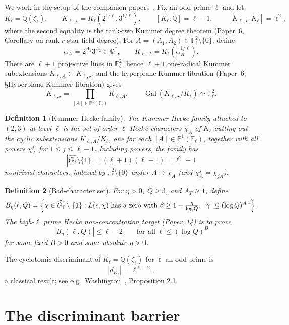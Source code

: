 \documentclass[11pt]{article}
\newtheorem{definition}{Definition}
\newcommand{\Q}{\mathbb Q}
\newcommand{\F}{\mathbb F}
\newcommand{\Pj}{\mathbb P}
\newcommand{\1}{\mathbf 1}
\newcommand{\Gal}{\operatorname{Gal}}
\begin{document}
We work in the setup of the companion papers~\cite{paper2,paper6,paper14}.  Fix an odd prime \(\ell\) and let
\[
K_\ell=\Q(\zeta_\ell),
\qquad
K_{\ell,\star}=K_\ell(2^{1/\ell},3^{1/\ell}),
\qquad
[K_\ell:\Q]=\ell-1,
\qquad
[K_{\ell,\star}:K_\ell]=\ell^2,
\]
where the second equality is the rank-two Kummer degree theorem (Paper~6, Corollary on rank-\(r\) star field degree).  For \(A=(A_1,A_2)\in\F_\ell^2\setminus\{0\}\), define
\[
\alpha_A=2^{A_1}3^{A_2}\in\Q^*,
\qquad
K_{\ell,A}=K_\ell(\alpha_A^{1/\ell}).
\]
There are \(\ell+1\) projective lines in \(\F_\ell^2\), hence \(\ell+1\) one-radical Kummer subextensions \(K_{\ell,A}\subset K_{\ell,\star}\), and the hyperplane Kummer fibration (Paper~6, \S Hyperplane Kummer fibration) gives
\[
K_{\ell,\star}=\prod_{[A]\in\Pj^1(\F_\ell)}K_{\ell,A},
\qquad
\Gal(K_{\ell,\star}/K_\ell)\simeq\F_\ell^2.
\]

\begin{definition}[Kummer Hecke family]\label{D:kummer-family}
The Kummer Hecke family attached to \((2,3)\) at level \(\ell\) is the set of order-\(\ell\) Hecke characters \(\chi_A\) of \(K_\ell\) cutting out the cyclic subextensions \(K_{\ell,A}/K_\ell\), one for each \([A]\in\Pj^1(\F_\ell)\), together with all powers \(\chi_A^j\) for \(1\le j\le\ell-1\).  Including powers, the family has
\[
|\widehat{G_\ell}\setminus\{1\}|=(\ell+1)(\ell-1)=\ell^2-1
\]
nontrivial characters, indexed by \(\F_\ell^2\setminus\{0\}\) under \(A\mapsto\chi_A\) (and \(\chi_A^j=\chi_{jA}\)).
\end{definition}

\begin{definition}[Bad-character set]\label{D:bad-set}
For \(\eta>0\), \(Q\ge 3\), and \(A_T\ge 1\), define
\[
B_\eta(\ell,Q)
=\Bigl\{\chi\in\widehat{G_\ell}\setminus\{1\}:L(s,\chi)\text{ has a zero with }\beta\ge1-\tfrac{\eta}{\log Q},\ |\gamma|\le(\log Q)^{A_T}\Bigr\}.
\]
The high-\(\ell\) prime Hecke non-concentration target (Paper~14) is to prove
\[
|B_\eta(\ell,Q)|\le\ell-2
\qquad\text{for all }\ell\le(\log Q)^B
\]
for some fixed \(B>0\) and some absolute \(\eta>0\).
\end{definition}

The cyclotomic discriminant of \(K_\ell=\Q(\zeta_\ell)\) for \(\ell\) an odd prime is
\[
|d_{K_\ell}|=\ell^{\ell-2},
\]
a classical result; see e.g.~Washington~\cite{Washington}, Proposition 2.1.

\section{The discriminant barrier}
\end{document}
